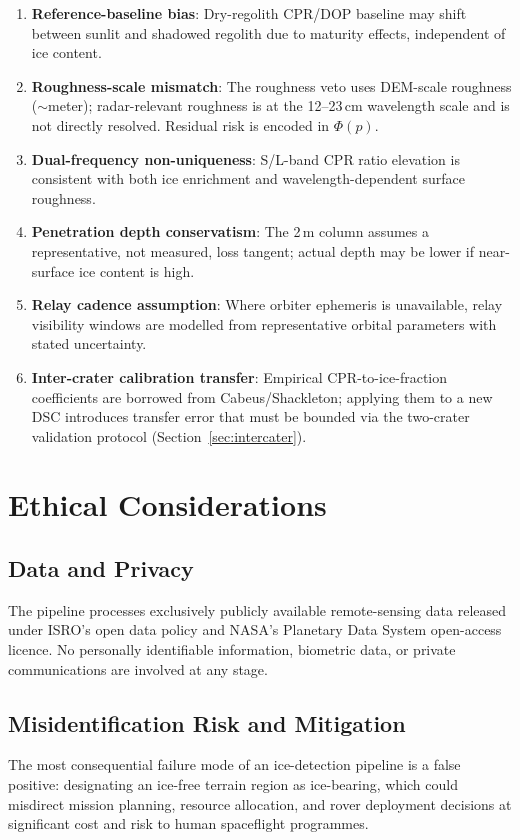 \documentclass[10pt,conference]{IEEEtran}
\begin{document}
\begin{enumerate}
  \item \textbf{Reference-baseline bias}: Dry-regolith CPR/DOP baseline
    may shift between sunlit and shadowed regolith due to maturity
    effects, independent of ice content.
  \item \textbf{Roughness-scale mismatch}: The roughness veto uses
    DEM-scale roughness ($\sim$meter); radar-relevant roughness is at
    the 12--23\,cm wavelength scale and is not directly resolved.
    Residual risk is encoded in $\Phi(p)$.
  \item \textbf{Dual-frequency non-uniqueness}: S/L-band CPR ratio
    elevation is consistent with both ice enrichment and
    wavelength-dependent surface roughness.
  \item \textbf{Penetration depth conservatism}: The 2\,m column assumes
    a representative, not measured, loss tangent; actual depth may be
    lower if near-surface ice content is high.
  \item \textbf{Relay cadence assumption}: Where orbiter ephemeris is
    unavailable, relay visibility windows are modelled from
    representative orbital parameters with stated uncertainty.
  \item \textbf{Inter-crater calibration transfer}: Empirical
    CPR-to-ice-fraction coefficients are borrowed from Cabeus/Shackleton;
    applying them to a new DSC introduces transfer error that must be
    bounded via the two-crater validation protocol (Section~\ref{sec:intercater}).
\end{enumerate}

\section{Ethical Considerations}
\label{sec:ethics}

\subsection{Data and Privacy}
The pipeline processes exclusively publicly available remote-sensing
data released under ISRO's open data policy and NASA's Planetary
Data System open-access licence.
No personally identifiable information, biometric data, or
private communications are involved at any stage.

\subsection{Misidentification Risk and Mitigation}
The most consequential failure mode of an ice-detection pipeline is
a false positive: designating an ice-free terrain region as
ice-bearing, which could misdirect mission planning, resource
allocation, and rover deployment decisions at significant cost and
risk to human spaceflight programmes.
\end{document}
